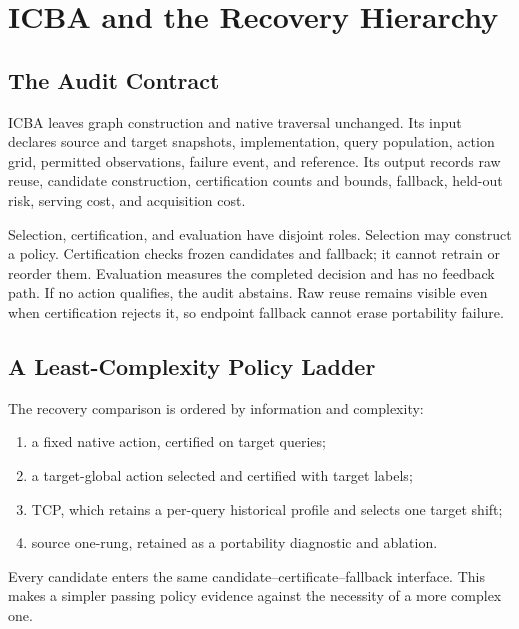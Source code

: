 \section{ICBA and the Recovery Hierarchy}
\label{sec:auditor}

\subsection{The Audit Contract}
ICBA leaves graph construction and native traversal unchanged. Its input declares source and target snapshots, implementation, query population, action grid, permitted observations, failure event, and reference. Its output records raw reuse, candidate construction, certification counts and bounds, fallback, held-out risk, serving cost, and acquisition cost.

Selection, certification, and evaluation have disjoint roles. Selection may construct a policy. Certification checks frozen candidates and fallback; it cannot retrain or reorder them. Evaluation measures the completed decision and has no feedback path. If no action qualifies, the audit abstains. Raw reuse remains visible even when certification rejects it, so endpoint fallback cannot erase portability failure.

\subsection{A Least-Complexity Policy Ladder}
The recovery comparison is ordered by information and complexity:
\begin{enumerate}
\item a fixed native action, certified on target queries;
\item a target-global action selected and certified with target labels;
\item TCP, which retains a per-query historical profile and selects one target shift;
\item source one-rung, retained as a portability diagnostic and ablation.
\end{enumerate}
Every candidate enters the same candidate--certificate--fallback interface. This makes a simpler passing policy evidence against the necessity of a more complex one.

